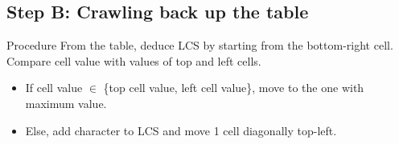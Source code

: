 \documentclass{beamer}
\begin{document}
\subsection{Step B: Crawling back up the table}
\begin{frame}[t]{Procedure}
  From the table, deduce LCS by starting from the bottom-right cell. Compare cell value with values of top and left cells.
  \begin{itemize}
    \item If cell value \( \in\) \{top cell value, left cell value\}, move to the one with maximum value. \\
    \item Else, add character to LCS and move 1 cell diagonally top-left.
  \end{itemize}
\end{frame}
\end{document}

